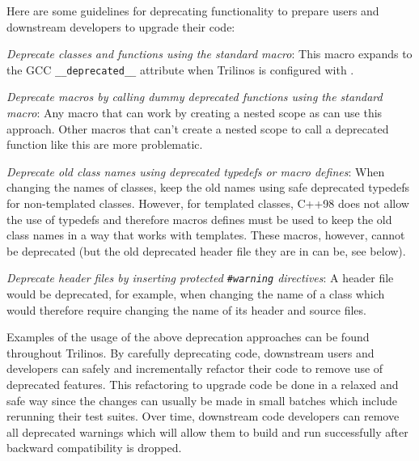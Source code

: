 \documentclass[11pt]{SANDreport}
\begin{document}
Here are some guidelines for deprecating functionality to prepare
users and downstream developers to upgrade their code:

\begin{compactitem}

{}\item\textit{Deprecate classes and functions using the standard
{} macro}: This macro expands to the
GCC {}\texttt{\_\_deprecated\_\_} attribute when Trilinos is
configured with {}.

{}\item\textit{Deprecate macros by calling dummy deprecated functions
using the standard {} macro}: Any
macro that can work by creating a nested scope as {} can use this approach.  Other macros
that can't create a nested scope to call a deprecated function like
this are more problematic.

{}\item\textit{Deprecate old class names using deprecated typedefs or
macro defines}: When changing the names of classes, keep the old names
using safe deprecated typedefs for non-templated classes.  However,
for templated classes, C++98 does not allow the use of typedefs and
therefore macros defines must be used to keep the old class names in a
way that works with templates.  These macros, however, cannot be
deprecated (but the old deprecated header file they are in can be, see
below).

{}\item\textit{Deprecate header files by inserting protected
{}\texttt{\#warning} directives}: A header file would be deprecated,
for example, when changing the name of a class which would therefore
require changing the name of its header and source files.

\end{compactitem}

Examples of the usage of the above deprecation approaches can be found
throughout Trilinos.  By carefully deprecating code, downstream users
and developers can safely and incrementally refactor their code to
remove use of deprecated features.  This refactoring to upgrade code
be done in a relaxed and safe way since the changes can usually be
made in small batches which include rerunning their test suites.  Over
time, downstream code developers can remove all deprecated warnings
which will allow them to build and run successfully after backward
compatibility is dropped.
\end{document}
